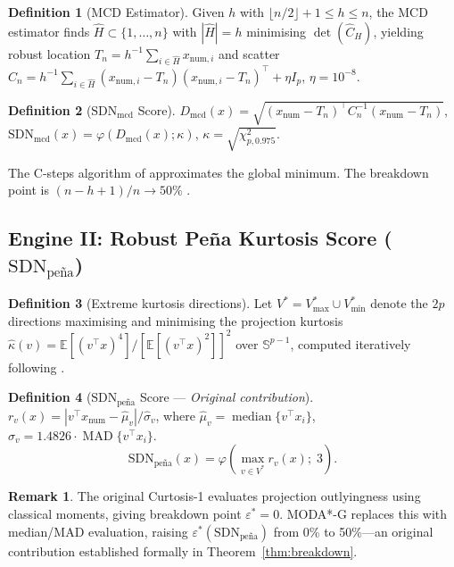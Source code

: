 \documentclass[11pt]{article}
\theoremstyle{plain}
\theoremstyle{definition}
\newtheorem{definition}{Definition}
\newtheorem{remark}{Remark}
\DeclareMathOperator{\MAD}{MAD}
\DeclareMathOperator{\median}{median}
\newcommand{\E}{\mathbb{E}}
\begin{document}
\begin{definition}[MCD Estimator]
\label{def:mcd}
Given $h$ with $\lfloor n/2 \rfloor + 1 \leq h \leq n$,
the MCD estimator finds $\hat{H} \subset \{1,\ldots,n\}$
with $|\hat{H}| = h$ minimising
$\det(\hat{C}_H)$, yielding robust location
$T_n = h^{-1}\sum_{i \in \hat{H}} x_{\text{num},i}$
and scatter
$C_n = h^{-1}\sum_{i \in \hat{H}}
(x_{\text{num},i} - T_n)(x_{\text{num},i} - T_n)^\top
+ \eta I_p$, $\eta = 10^{-8}$.
\end{definition}

\begin{definition}[$\text{SDN}_\text{mcd}$ Score]
\label{def:smcd}
$D_\text{mcd}(x) = \sqrt{(x_\text{num} - T_n)^\top
C_n^{-1}(x_\text{num} - T_n)}$,\quad
$\text{SDN}_\text{mcd}(x) = \varphi(D_\text{mcd}(x);
\kappa)$, $\kappa = \sqrt{\chi^2_{p,0.975}}$.
\end{definition}

The C-steps algorithm of \citet{rousseeuw1999}
approximates the global minimum. The breakdown point is
$(n-h+1)/n \to 50\%$ \citep{rousseeuw1985}.

\subsection{Engine II: Robust Pe\~{n}a Kurtosis Score
  ($\text{SDN}_\text{pe\~{n}a}$)}
\label{sec:engine2}

\begin{definition}[Extreme kurtosis directions]
\label{def:Vstar}
Let $V^* = V^*_{\max} \cup V^*_{\min}$ denote the $2p$
directions maximising and minimising the projection
kurtosis $\hat{\kappa}(v) = \E[(v^\top x)^4] /
[\E[(v^\top x)^2]]^2$ over $\mathbb{S}^{p-1}$,
computed iteratively following \citet{pena2001}.
\end{definition}

\begin{definition}[$\text{SDN}_\text{pe\~{n}a}$ Score
  --- \emph{Original contribution}]
\label{def:spena}
$r_v(x) = |v^\top x_\text{num} - \hat{\mu}_v|/
\hat{\sigma}_v$, where
$\hat{\mu}_v = \median\{v^\top x_i\}$,
$\hat{\sigma}_v = 1.4826\cdot\MAD\{v^\top x_i\}$.
\[
  \text{SDN}_\text{pe\~{n}a}(x) =
  \varphi\!\left(\max_{v \in V^*} r_v(x);\; 3\right).
\]
\end{definition}

\begin{remark}
The original Curtosis-1 \citep{pena2001} evaluates
projection outlyingness using classical moments, giving
breakdown point $\varepsilon^* = 0$. MODA*-G replaces
this with median/MAD evaluation, raising
$\varepsilon^*(\text{SDN}_\text{pe\~{n}a})$ from 0\%
to 50\%---an original contribution established formally
in Theorem~\ref{thm:breakdown}.
\end{remark}
\end{document}
